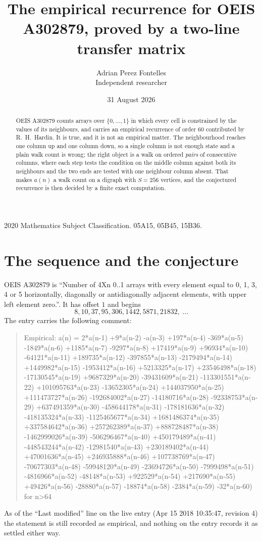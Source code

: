\documentclass[11pt,a4paper]{article}
\title{The empirical recurrence for OEIS A302879, proved by a two-line transfer matrix}
\author{Adrian Perez Fontelles\\ \small Independent researcher}
\date{31 August 2026}
\theoremstyle{plain}
\theoremstyle{definition}
\begin{document}
\maketitle

\begin{abstract}
OEIS A302879 counts arrays over $\{0,\dots,1\}$ in which every cell is constrained by the
values of its neighbours, and carries an empirical recurrence of order $60$ contributed
by R.~H.~Hardin. It is true, and it is not an empirical matter. The neighbourhood reaches one
column up and one column down, so a single column is not enough state and a plain walk count
is wrong; the right object is a walk on ordered \emph{pairs} of consecutive columns, where
each step tests the condition on the middle column against both its neighbours and the two
ends are tested with one neighbour column absent. That makes $a(n)$ a walk count on a digraph
with $S=256$ vertices, and the conjectured recurrence is then decided by a finite exact
computation.
\end{abstract}

\noindent\small 2020 Mathematics Subject Classification. 05A15, 05B45, 15B36.\normalsize

\section{The sequence and the conjecture}

OEIS A302879 is ``Number of 4Xn 0..1 arrays with every element equal to 0, 1, 3, 4 or 5 horizontally, diagonally or antidiagonally adjacent elements, with upper left element zero.''. It has offset $1$ and begins
\[
8, 10, 37, 95, 306, 1442, 5871, 21832,\ \dots
\]
The entry carries the following comment:
\begin{quote}\small
Empirical: a(n) = 2*a(n-1) +9*a(n-2) -a(n-3) +197*a(n-4) -369*a(n-5) -1849*a(n-6) +1185*a(n-7) -9297*a(n-8) +17419*a(n-9) +96934*a(n-10) -64121*a(n-11) +189735*a(n-12) -397855*a(n-13) -2179494*a(n-14) +1449982*a(n-15) -1953412*a(n-16) +5213325*a(n-17) +23546498*a(n-18) -17130545*a(n-19) +9687329*a(n-20) -39431609*a(n-21) -113301551*a(n-22) +101095763*a(n-23) -13652305*a(n-24) +144037950*a(n-25) +111473727*a(n-26) -192684002*a(n-27) -14180716*a(n-28) -92338753*a(n-29) +637491359*a(n-30) -458644178*a(n-31) -178181636*a(n-32) -418135324*a(n-33) -1125465677*a(n-34) +1681486374*a(n-35) +337584642*a(n-36) +257262389*a(n-37) +888728487*a(n-38) -1462999026*a(n-39) -506296467*a(n-40) +450179489*a(n-41) -448543244*a(n-42) -12981540*a(n-43) +230189402*a(n-44) +47001636*a(n-45) +246935888*a(n-46) +107738769*a(n-47) -70677303*a(n-48) -59948120*a(n-49) -23694726*a(n-50) -7999498*a(n-51) -4816966*a(n-52) -48148*a(n-53) +922529*a(n-54) +217690*a(n-55) +49426*a(n-56) -28880*a(n-57) -18874*a(n-58) -2384*a(n-59) -32*a(n-60) for n>64
\end{quote}
As of the ``Last modified'' line on the live entry (Apr 15 2018 10:35:47, revision 4) the statement is
still recorded as empirical, and nothing on the entry records it as settled either way.
\end{document}
